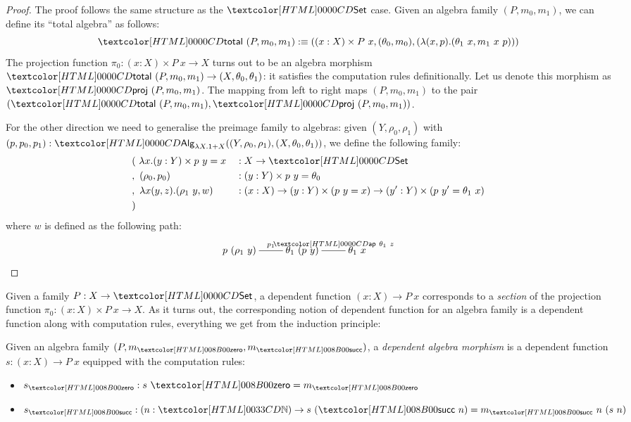 \begin{proof}
  The proof follows the same structure as the $\Set$ case. Given an
  algebra family $(P,m_0,m_1)$, we can define its ``total algebra'' as
  follows:
  $$
  \total\ (P,m_0,m_1) \ddefeq ((x : X) \times P\ x , (\theta_0, m_0), (\lambda (x,p) . (\theta_1\ x, m_1\ x\ p)))
  $$
  The projection function $\pi_0 : (x : X) \times P\ x \to X$ turns
  out to be an algebra morphism
  $\total\ (P,m_0,m_1) \to (X,\theta_0,\theta_1)$: it satisfies the
  computation rules definitionally. Let us denote this morphism as
  $\proj\ (P,m_0,m_1)$. The mapping from left to right maps
  $(P,m_0,m_1)$ to the pair
  $(\total\ (P,m_0,m_1), \proj\ (P,m_0,m_1))$.

  For the other direction we need to generalise the preimage family to
  algebras: given $(Y,\rho_0,\rho_1)$ with
  $(p,p_0,p_1) : \Alg_{\lambda X . 1 +
    X}((Y,\rho_0,\rho_1),(X,\theta_0,\theta_1))$,
  we define the following family:
  \begin{align*}
  &(\ \lambda x . (y : Y) \times p\ y = x &&: X \to \Set \\
  &,\ (\rho_0 , p_0) &&: (y : Y) \times p\ y = \theta_0 \\
  &,\ \lambda x (y,z) . (\rho_1\ y , w) &&: (x : X) \to (y : Y) \times (p\ y = x) \to (y' : Y) \times (p\ y' = \theta_1\ x)\\
  &)
  \end{align*}
  where $w$ is defined as the following path:
  $$
  \xymatrix{
    p\ (\rho_1\ y) \ar@{-}[r]^-{p_1} &\theta_1\ (p\ y) \ar@{-}^-{\ap\ \theta_1\ z}[r] &\theta_1\ x
  }
  $$
\end{proof}

Given a family $P : X \to \Set$, a dependent function
$(x : X) \to P\ x$ corresponds to a \emph{section} of the projection
function $\pi_0 : (x : X) \times P\ x \to X$. As it turns out, the
corresponding notion of dependent function for an algebra family is a
dependent function along with computation rules, \ie everything we get
from the induction principle:

\begin{definition}
  Given an algebra family $(P,m_{\natzero},m_{\natsucc})$, a \emph{dependent algebra
    morphism} is a dependent function $s : (x : X) \to P\ x$ equipped
  with the computation rules:
  \begin{itemize}
  \item $s_{\natzero} : s\ \natzero = m_{\natzero}$

  \item $s_{\natsucc} : (n : \natty) \to s\ (\natsucc\ n) = m_{\natsucc}\ n\ (s\ n)$
  \end{itemize}
\end{definition}


